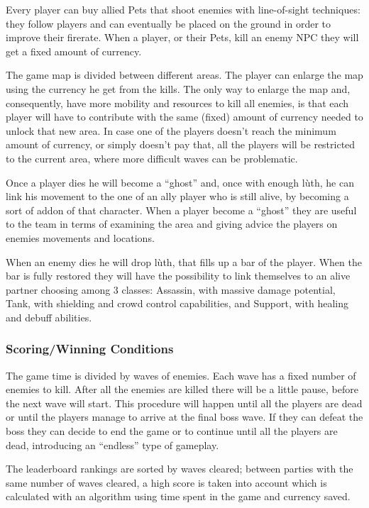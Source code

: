 \documentclass[12pt]{article}
\begin{document}
Every player can buy allied Pets that shoot enemies with line-of-sight techniques: they follow players and can eventually be placed on the ground in order to improve their firerate. When a player, or their Pets, kill an enemy NPC they will get a fixed amount of currency.

The game map is divided between different areas. The player can enlarge the map using the currency he get from the kills. The only way to enlarge the map and, consequently, have more mobility and resources to kill all enemies, is that each player will have to contribute with the same (fixed) amount of currency needed to unlock that new area. In case one of the players doesn’t reach the minimum amount of currency, or simply doesn’t pay that, all the players will be restricted to the current area, where more difficult waves can be problematic.

Once a player dies he will become a “ghost” and, once with enough lùth, he can link his movement to the one of an ally player who is still alive, by becoming a sort of addon of that character. When a player become a “ghost” they are useful to the team in terms of examining the area and giving advice the players on enemies movements and locations.

When an enemy dies he will drop lùth, that fills up a bar of the player. When the bar is fully restored they will have the possibility to link themselves to an alive partner choosing among 3 classes: Assassin, with massive damage potential, Tank, with shielding and crowd control capabilities, and Support, with healing and debuff abilities.

\subsubsection{Scoring/Winning Conditions}

The game time is divided by waves of enemies. Each wave has a fixed number of enemies to kill. After all the enemies are killed there will be a little pause, before the next wave will start. This procedure will happen until all the players are dead or until the players manage to arrive at the final boss wave. If they can defeat the boss they can decide to end the game or to continue until all the players are dead, introducing an “endless” type of gameplay.

The leaderboard rankings are sorted by waves cleared; between parties with the same number of waves cleared, a high score is taken into account which is calculated with an algorithm using time spent in the game and currency saved. 
\end{document}
